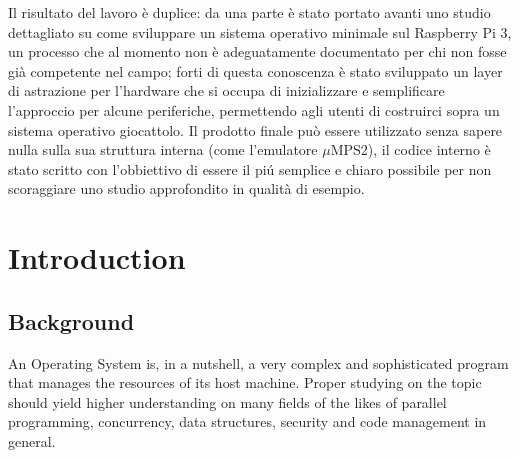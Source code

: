 \documentclass[12pt,a4paper,openright,twoside]{report}
\begin{document}
Il risultato del lavoro \`e duplice: da una parte \`e stato portato avanti uno 
studio dettagliato su come sviluppare un sistema operativo minimale sul Raspberry
Pi 3, un processo che al momento non \`e adeguatamente documentato per chi non
fosse gi\`a competente nel campo; forti di questa conoscenza \`e stato sviluppato un
layer di astrazione per l'hardware che si occupa di inizializzare e semplificare
l'approccio per alcune periferiche, permettendo agli utenti di costruirci sopra
un sistema operativo giocattolo. Il prodotto finale pu\`o essere utilizzato senza
sapere nulla sulla sua struttura interna (come l'emulatore $\mu$MPS2), il codice 
interno \`e stato scritto con l'obbiettivo di essere il pi\'u semplice e chiaro
possibile per non scoraggiare uno studio approfondito in qualit\`a di esempio.

\renewcommand\labelitemi{\tiny$\bullet$}

\clearpage{\pagestyle{empty}\cleardoublepage}
\tableofcontents                        %
\rhead[\fancyplain{}{\bfseries\leftmark}]{\fancyplain{}{\bfseries\thepage}}
\clearpage{\pagestyle{empty}\cleardoublepage}
\listoffigures                          %
\clearpage{\pagestyle{empty}\cleardoublepage}
\listoftables                           %
\clearpage{\pagestyle{empty}\cleardoublepage}
\chapter{Introduction}                %
\lhead[\fancyplain{}{\bfseries\thepage}]{\fancyplain{}{\bfseries\rightmark}}
\section{Background}
An Operating System is, in a nutshell, a very complex and sophisticated program
that manages the resources of its host machine. Proper studying on the topic 
should yield higher understanding on many fields of the likes of
parallel programming, concurrency, data structures, security and 
code management in general.
\end{document}
